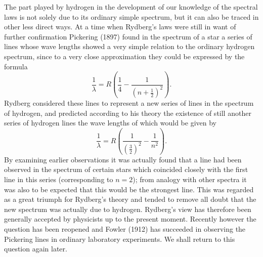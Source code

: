 The part played by hydrogen in the development of our
knowledge of the spectral laws is not solely due to its ordinary
simple spectrum, but it can also be traced in other less direct
ways. At a time when Rydberg's laws were still in want of
further confirmation Pickering (1897) found in the spectrum of a
star a series of lines whose wave lengths showed a very simple relation
to the ordinary hydrogen spectrum, since to a very close
approximation they could be expressed by the formula
\[
\frac{1}{\lambda} = R\left(\frac{1}{4} - \frac{1}{(n + \frac{1}{2})^{2}}\right).
\]
Rydberg considered these lines to represent a new series of lines
in the spectrum of hydrogen, and predicted according to his theory
the existence of still another series of hydrogen lines the wave
lengths of which would be given by
\[
\frac{1}{\lambda} = R\left(\frac{1}{(\frac{3}{2})^{2}} - \frac{1}{n^{2}}\right).
\]
By examining earlier observations it was actually found that a line
had been observed in the spectrum of certain stars which coincided
closely with the first line in this series (corresponding to $n = 2$);
from analogy with other spectra it was also to be expected that this
would be the strongest line. This was regarded as a great triumph
for Rydberg's theory and tended to remove all doubt that the new
spectrum was actually due to hydrogen. Rydberg's view has therefore
been generally accepted by physicists up to the present moment.
Recently however the question has been reopened and Fowler
(1912) has succeeded in observing the Pickering lines in ordinary
laboratory experiments. We shall return to this question again
later.


